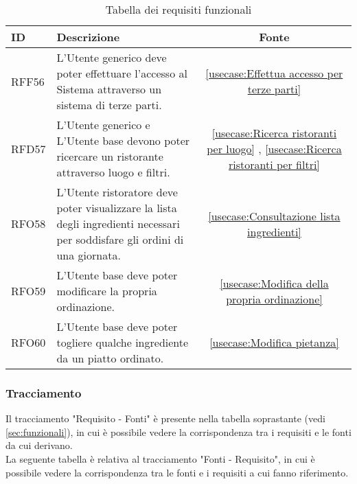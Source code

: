 \begin{table}[H]
	\renewcommand{\arraystretch}{1.5}
	\centering
	\begin{tabularx}{\textwidth}{l|X|c}
		\textbf{ID} & \textbf{Descrizione}                                                                                                    & \textbf{Fonte}                                                       \\
		\hline
		RFF56       & L'Utente generico deve poter effettuare l'accesso al Sistema attraverso un sistema di terze parti.                 	& \autoref{usecase:Effettua accesso per terze parti} \\
		\hline
		RFD57	   & L'Utente generico e L'Utente base devono poter ricercare un
		ristorante attraverso luogo e filtri.  					&
		\autoref{usecase:Ricerca ristoranti per luogo} , \autoref{usecase:Ricerca ristoranti per filtri} \\
		\hline
		RFO58	   & L'Utente ristoratore deve poter visualizzare la lista degli ingredienti necessari per soddisfare gli ordini di una giornata. & \autoref{usecase:Consultazione lista ingredienti} \\ 
		\hline
		RFO59	   & L'Utente base deve poter modificare la propria ordinazione.  & \autoref{usecase:Modifica della propria ordinazione} \\
		\hline
		RFO60	   & L'Utente base deve poter togliere qualche ingrediente da un piatto ordinato. & \autoref{usecase:Modifica pietanza} \\	
	\end{tabularx}
	\caption{Tabella dei requisiti funzionali}
\end{table}

\newpage
\subsubsection{Tracciamento}
Il tracciamento "Requisito - Fonti" è presente nella tabella soprastante (vedi \autoref{sec:funzionali}), in cui è possibile vedere la corrispondenza tra i requisiti e le fonti da cui derivano.\\
La seguente tabella è relativa al tracciamento "Fonti - Requisito", in cui è possibile vedere la corrispondenza tra le fonti e i requisiti a cui fanno riferimento.\\

